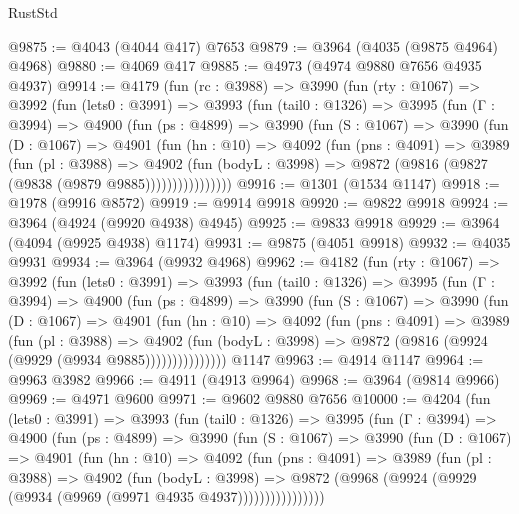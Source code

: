 \begin{lexlean}{RustStd}
\begin{coremodule}
@9875 := @4043 (@4044 @417) @7653
@9879 := @3964 (@4035 (@9875 @4964) @4968)
@9880 := @4069 @417
@9885 := @4973 (@4974 @9880 @7656 @4935 @4937)
@9914 := @4179
    (fun (rc : @3988) =>
    @3990
      (fun (rty : @1067) =>
      @3992
        (fun (lets0 : @3991) =>
        @3993
          (fun (tail0 : @1326) =>
          @3995
            (fun (Γ : @3994) =>
            @4900
              (fun (ps : @4899) =>
              @3990
                (fun (S : @1067) =>
                @3990
                  (fun (D : @1067) =>
                  @4901
                    (fun (hn : @10) =>
                    @4092
                      (fun (pns : @4091) =>
                      @3989
                        (fun (pl : @3988) =>
                        @4902
                          (fun (bodyL : @3998) =>
                          @9872 (@9816 (@9827 (@9838 (@9879 @9885))))))))))))))))
@9916 := @1301 (@1534 @1147)
@9918 := @1978 (@9916 @8572)
@9919 := @9914 @9918
@9920 := @9822 @9918
@9924 := @3964 (@4924 (@9920 @4938) @4945)
@9925 := @9833 @9918
@9929 := @3964 (@4094 (@9925 @4938) @1174)
@9931 := @9875 (@4051 @9918)
@9932 := @4035 @9931
@9934 := @3964 (@9932 @4968)
@9962 := @4182
    (fun (rty : @1067) =>
    @3992
      (fun (lets0 : @3991) =>
      @3993
        (fun (tail0 : @1326) =>
        @3995
          (fun (Γ : @3994) =>
          @4900
            (fun (ps : @4899) =>
            @3990
              (fun (S : @1067) =>
              @3990
                (fun (D : @1067) =>
                @4901
                  (fun (hn : @10) =>
                  @4092
                    (fun (pns : @4091) =>
                    @3989
                      (fun (pl : @3988) =>
                      @4902
                        (fun (bodyL : @3998) =>
                        @9872 (@9816 (@9924 (@9929 (@9934 @9885)))))))))))))))
    @1147
@9963 := @4914 @1147
@9964 := @9963 @3982
@9966 := @4911 (@4913 @9964)
@9968 := @3964 (@9814 @9966)
@9969 := @4971 @9600
@9971 := @9602 @9880 @7656
@10000 := @4204
    (fun (lets0 : @3991) =>
    @3993
      (fun (tail0 : @1326) =>
      @3995
        (fun (Γ : @3994) =>
        @4900
          (fun (ps : @4899) =>
          @3990
            (fun (S : @1067) =>
            @3990
              (fun (D : @1067) =>
              @4901
                (fun (hn : @10) =>
                @4092
                  (fun (pns : @4091) =>
                  @3989
                    (fun (pl : @3988) =>
                    @4902
                      (fun (bodyL : @3998) =>
                      @9872 (@9968 (@9924 (@9929 (@9934 (@9969 (@9971 @4935 @4937))))))))))))))))

\end{coremodule}
\end{lexlean}
